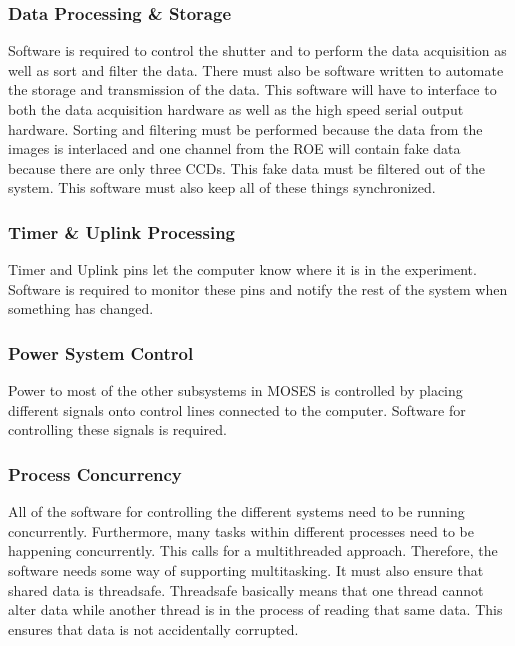 \documentclass[11pt,titlepage]{article}
\begin{document}
\subsubsection{Data Processing \& Storage}
 
Software is required to control the shutter and to perform the data acquisition as well as sort and filter the data. There must also be software 
written to automate the storage
and transmission of the data. This software will have to interface to both the data acquisition hardware as well as the high speed serial output 
hardware. Sorting and filtering must be performed because the data from the images is interlaced and one channel from the ROE will contain fake 
data because there are only three CCDs. This fake data must be filtered out of the system. This software must also keep all of these things
synchronized. 


\subsubsection{Timer \& Uplink Processing}
Timer and Uplink pins let the computer know where it is in the experiment. Software is required to monitor these pins and notify the rest of the system
when something has changed.


\subsubsection{Power System Control}

Power to most of the other subsystems in MOSES is controlled by placing different signals onto control lines connected to the computer. Software for 
controlling these signals is required.

\subsubsection{Process Concurrency}

All of the software for controlling the different systems need to be running concurrently. Furthermore, many tasks within different processes need to
be happening concurrently. This calls for a multithreaded approach. Therefore, the software needs some way of supporting multitasking. It must also ensure
that shared data is threadsafe. Threadsafe basically means that one thread cannot alter data while another thread is in the process of reading that same
data. This ensures that data is not accidentally corrupted.
\end{document}
